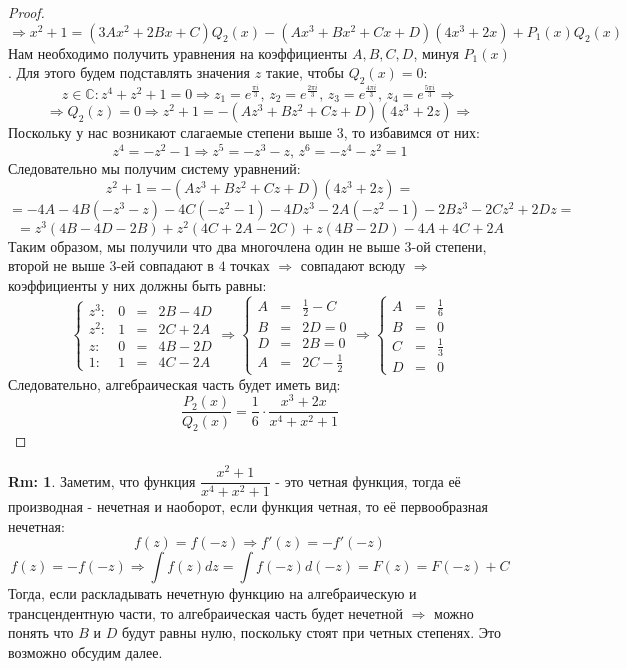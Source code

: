 \documentclass[12pt]{article}
\newcommand{\MC}{\mathbb{C}}
\theoremstyle{definition}
\newtheorem{rem}{Rm:}
\DeclareMathOperator{\dint}{\displaystyle\int}
\begin{document}
\begin{proof}
$$	$$
	$$
		\Rightarrow x^2 + 1 = (3Ax^2 + 2Bx + C)Q_2(x) - (Ax^3 + Bx^2 + Cx + D)(4x^3 + 2x) + P_1(x)Q_2(x)
	$$
	Нам необходимо получить уравнения на коэффициенты $A,B,C,D$, минуя $P_1(x)$. Для этого будем подставлять значения $z$ такие, чтобы $Q_2(x) = 0$:
	$$
		z \in \MC \colon z^4 + z^2 +  1 = 0 \Rightarrow z_1 = e^{\frac{\pi i}{3}},\, z_2 = e^{\frac{2\pi i }{3}}, \, z_3 = e^{\frac{4\pi i}{3}}, \, z_4 = e^{\frac{5\pi i}{3}} \Rightarrow 
	$$
	$$
		\Rightarrow Q_2(z) = 0 \Rightarrow z^2 + 1 = -(Az^3 + Bz^2 + Cz + D)(4z^3  + 2z) \Rightarrow
	$$
	 Поскольку у нас возникают слагаемые степени выше $3$, то избавимся от них:
	$$
		z^4 = -z^2 - 1 \Rightarrow z^5 = -z^3- z, \, z^6 = -z^4 - z^2 = 1
	$$
	Следовательно мы получим систему уравнений:
	$$
		z^2 + 1 = -(Az^3 + Bz^2 + Cz + D)(4z^3 + 2z) =
	$$
	$$
		 = -4A - 4B(-z^3- z) - 4C(-z^2 -1) - 4Dz^3 - 2A(-z^2 - 1) - 2Bz^3 - 2Cz^2 + 2Dz = 
	$$
	$$
		= z^3(4B - 4D - 2B) + z^2(4C +2A - 2C)+ z(4B - 2D) - 4A + 4C + 2A
	$$
	Таким образом, мы получили что два многочлена один не выше $3$-ой степени, второй не выше $3$-ей совпадают в $4$ точках $\Rightarrow$ совпадают всюду $\Rightarrow$ коэффициенты у них должны быть равны:
	$$
		\left\{
		\begin{array}{ccccc}
			z^3 \colon& 0 & = &  2B - 4D\\
			z^2 \colon& 1 & = & 2C + 2A\\
			z \colon& 0 & = & 4B - 2D\\
			1 \colon & 1 &=& 4C -2A
		\end{array}
		\right. \Rightarrow
		\left\{
		\begin{array}{ccc}
			A & = & \tfrac{1}{2} - C\\ [8pt]
			B & = & 2D  = 0\\[8pt]
			D & = & 2B  = 0\\[8pt]
			A & = & 2C - \tfrac{1}{2}
		\end{array} \Rightarrow
		\right. 		
		\left\{
		\begin{array}{ccc}
			A & = & \tfrac{1}{6} \\[8pt]
			B & = & 0 \\[8pt]
			C & = & \tfrac{1}{3} \\[8pt]
			D & = & 0
		\end{array}
		\right. 
	$$
	Следовательно, алгебраическая часть будет иметь вид:
	$$
		\dfrac{P_2(x)}{Q_2(x)} = \dfrac{1}{6}{\cdot}\dfrac{ x^3 + 2x }{x^4 + x^2 + 1}
	$$
\end{proof}
\begin{rem}
	Заметим, что функция $\dfrac{x^2 + 1}{x^4 + x^2 + 1}$ - это четная функция, тогда её производная - нечетная и наоборот, если функция четная, то её первообразная нечетная: 
	$$
		f(z) = f(-z) \Rightarrow f'(z) = -f'(-z)
	$$
	$$	
		f(z) = -f(-z) \Rightarrow \dint f(z)dz = \dint f(-z)d(-z) = F(z) = F(-z) +C
	$$
	Тогда, если раскладывать нечетную функцию на алгебраическую и трансцендентную части, то алгебраическая часть будет нечетной $\Rightarrow$ можно понять что $B$ и $D$ будут равны нулю, поскольку стоят при четных степенях. Это возможно обсудим далее.
\end{rem}
\end{document}
